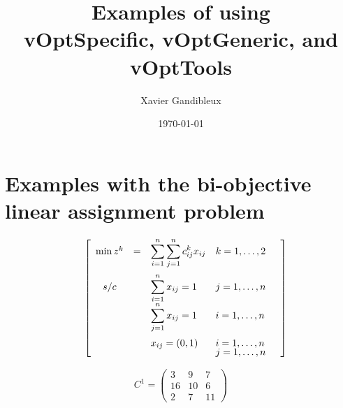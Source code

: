 \documentclass[11pt]{article}
\title{Examples of using \\ vOptSpecific, vOptGeneric, and vOptTools}
\author{Xavier Gandibleux }
\date{\today}
\begin{document}
\maketitle
{}
\vspace{5mm}

\tableofcontents
\break

%
%
\section{Examples with the bi-objective linear assignment problem}

\vspace{5mm}  \vspace{5mm} 

$$
\quad
\left [
\begin{array}{cllllll}

  \min z^k&  =  & \displaystyle{\sum_{i=1}^{n}\sum_{j=1}^{n} c^k_{ij} x_{ij}}  &  k=1,\dots,2\vspace{2mm} \\

  s/c &\  &   \displaystyle{\sum_{i=1}^{n}  x_{ij}}   =  1 &   j=1,\dots ,n \  \ \  \\
        &  &   \displaystyle{\sum_{j=1}^{n}  x_{ij}}   =  1 &  i=1,\dots ,n \    \vspace{2mm} \\

&  &   x_{ij} = (0,1) &   i=1,\dots ,n  \vspace{-1mm}\\
&  &    &  j=1,\dots ,n\\ 
 
\end{array}
\right ]
$$

\vspace{5mm}  \vspace{5mm} 


$$
C^1 = \left(\begin{array}{ccccc}
3  & 9 &  7 \\
16 &  10  & 6  \\
2  & 7 & 11    
\end{array}
\right)
$$
\medskip
\end{document}

